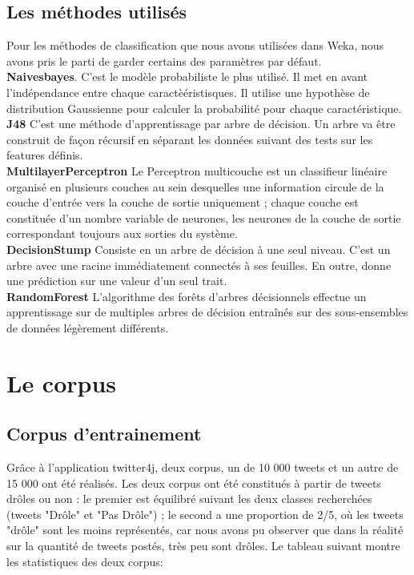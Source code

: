 \documentclass[10pt,a4paper,twoside]{article}
\begin{document}
\subsection{Les méthodes utilisés}
\label{methode}
Pour les méthodes de classification que nous avons utilisées dans Weka, nous avons pris le parti de garder certains des paramètres par défaut. \\
\textbf{Naivesbayes}. C'est le modèle probabiliste le plus utilisé. Il met en avant l'indépendance entre chaque caractèéristisques. Il utilise une hypothèse de distribution Gaussienne pour calculer la probabilité pour chaque caractéristique.\\
\textbf{J48} C'est une méthode d'apprentissage par arbre de décision. Un arbre va être construit de façon récursif en séparant les données suivant des tests sur les features définis.  \\
\textbf{MultilayerPerceptron} Le Perceptron multicouche est un classifieur linéaire organisé en plusieurs couches au sein desquelles une information circule de la couche d'entrée vers la couche de sortie uniquement ; chaque couche est constituée d'un nombre variable de neurones, les neurones de la couche de sortie correspondant toujours aux sorties du système.\\
\textbf{DecisionStump} Consiste en un arbre de décision à une seul niveau. C'est un arbre avec une racine immédiatement connectés à ses feuilles. En outre, donne une prédiction sur une valeur d'un seul trait.\\
\textbf{RandomForest} L'algorithme des forêts d'arbres décisionnels effectue un apprentissage sur de multiples arbres de décision entraînés sur des sous-ensembles de données légèrement différents.


\section{Le corpus}
\label{corpus}
\subsection{Corpus d'entrainement}

Grâce à l'application twitter4j, deux corpus, un de 10 000 tweets et un autre de 15 000 ont été réalisés. Les deux corpus ont été constitués à partir de tweets drôles ou non : le premier est équilibré suivant les deux classes recherchées (tweets "Drôle" et "Pas Drôle") ; le second a une proportion de 2/5, où les tweets "drôle" sont les moins représentés, car nous avons pu observer que dans la réalité sur la quantité de tweets postés, très peu sont drôles. Le tableau suivant montre les statistiques des deux corpus: 
\end{document}
